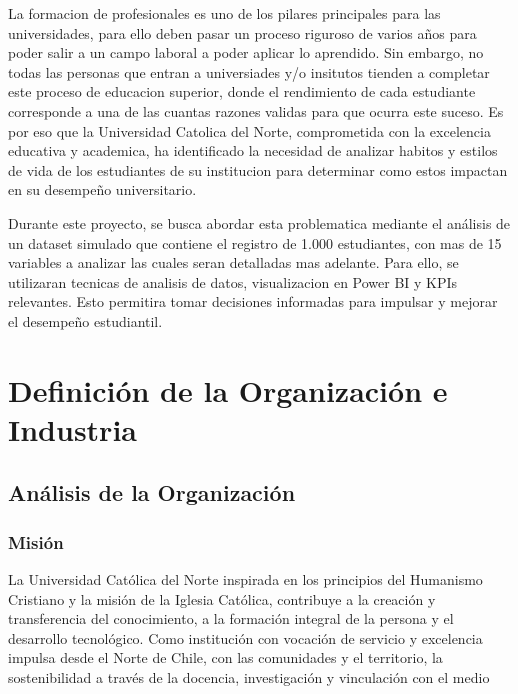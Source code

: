 \documentclass[12pt,letterpaper]{report}
\begin{document}
La formacion de profesionales es uno de los pilares principales para las universidades, para ello deben pasar un proceso riguroso de varios años para poder salir a un campo laboral a poder aplicar lo aprendido. Sin embargo, no todas las personas que entran a universiades y/o insitutos tienden a completar este proceso de educacion superior, donde el rendimiento de cada estudiante corresponde a una de las cuantas razones validas para que ocurra este suceso. Es por eso que la Universidad Catolica del Norte, comprometida con la excelencia educativa y academica, ha identificado la necesidad de analizar habitos y estilos de vida de los estudiantes de su institucion para determinar como estos impactan en su desempeño universitario.

Durante este proyecto, se busca abordar esta problematica mediante el análisis de un dataset simulado que contiene el registro de 1.000 estudiantes, con mas de 15 variables a analizar las cuales seran detalladas mas adelante. Para ello, se utilizaran tecnicas de analisis de datos, visualizacion en Power BI y KPIs relevantes. Esto permitira tomar decisiones informadas para impulsar y mejorar el desempeño estudiantil.



\newpage

\chapter{Definición de la Organización e Industria}

\section{Análisis de la Organización}

\subsection{Misión}
La Universidad Católica del Norte inspirada en los principios del Humanismo Cristiano y la misión de la Iglesia Católica, contribuye a la creación y transferencia del conocimiento, a la formación integral de la persona y el desarrollo tecnológico. Como institución con vocación de servicio y excelencia impulsa desde el Norte de Chile, con las comunidades y el territorio, la sostenibilidad a través de la docencia, investigación y vinculación con el medio
\end{document}
